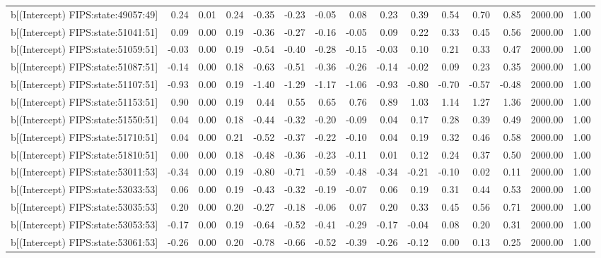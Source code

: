 \begin{table}[ht]
\begin{tabular}{rrrrrrrrrrrrrrr}
  b[(Intercept) FIPS:state:49057:49] & 0.24 & 0.01 & 0.24 & -0.35 & -0.23 & -0.05 & 0.08 & 0.23 & 0.39 & 0.54 & 0.70 & 0.85 & 2000.00 & 1.00 \\ 
  b[(Intercept) FIPS:state:51041:51] & 0.09 & 0.00 & 0.19 & -0.36 & -0.27 & -0.16 & -0.05 & 0.09 & 0.22 & 0.33 & 0.45 & 0.56 & 2000.00 & 1.00 \\ 
  b[(Intercept) FIPS:state:51059:51] & -0.03 & 0.00 & 0.19 & -0.54 & -0.40 & -0.28 & -0.15 & -0.03 & 0.10 & 0.21 & 0.33 & 0.47 & 2000.00 & 1.00 \\ 
  b[(Intercept) FIPS:state:51087:51] & -0.14 & 0.00 & 0.18 & -0.63 & -0.51 & -0.36 & -0.26 & -0.14 & -0.02 & 0.09 & 0.23 & 0.35 & 2000.00 & 1.00 \\ 
  b[(Intercept) FIPS:state:51107:51] & -0.93 & 0.00 & 0.19 & -1.40 & -1.29 & -1.17 & -1.06 & -0.93 & -0.80 & -0.70 & -0.57 & -0.48 & 2000.00 & 1.00 \\ 
  b[(Intercept) FIPS:state:51153:51] & 0.90 & 0.00 & 0.19 & 0.44 & 0.55 & 0.65 & 0.76 & 0.89 & 1.03 & 1.14 & 1.27 & 1.36 & 2000.00 & 1.00 \\ 
  b[(Intercept) FIPS:state:51550:51] & 0.04 & 0.00 & 0.18 & -0.44 & -0.32 & -0.20 & -0.09 & 0.04 & 0.17 & 0.28 & 0.39 & 0.49 & 2000.00 & 1.00 \\ 
  b[(Intercept) FIPS:state:51710:51] & 0.04 & 0.00 & 0.21 & -0.52 & -0.37 & -0.22 & -0.10 & 0.04 & 0.19 & 0.32 & 0.46 & 0.58 & 2000.00 & 1.00 \\ 
  b[(Intercept) FIPS:state:51810:51] & 0.00 & 0.00 & 0.18 & -0.48 & -0.36 & -0.23 & -0.11 & 0.01 & 0.12 & 0.24 & 0.37 & 0.50 & 2000.00 & 1.00 \\ 
  b[(Intercept) FIPS:state:53011:53] & -0.34 & 0.00 & 0.19 & -0.80 & -0.71 & -0.59 & -0.48 & -0.34 & -0.21 & -0.10 & 0.02 & 0.11 & 2000.00 & 1.00 \\ 
  b[(Intercept) FIPS:state:53033:53] & 0.06 & 0.00 & 0.19 & -0.43 & -0.32 & -0.19 & -0.07 & 0.06 & 0.19 & 0.31 & 0.44 & 0.53 & 2000.00 & 1.00 \\ 
  b[(Intercept) FIPS:state:53035:53] & 0.20 & 0.00 & 0.20 & -0.27 & -0.18 & -0.06 & 0.07 & 0.20 & 0.33 & 0.45 & 0.56 & 0.71 & 2000.00 & 1.00 \\ 
  b[(Intercept) FIPS:state:53053:53] & -0.17 & 0.00 & 0.19 & -0.64 & -0.52 & -0.41 & -0.29 & -0.17 & -0.04 & 0.08 & 0.20 & 0.31 & 2000.00 & 1.00 \\ 
  b[(Intercept) FIPS:state:53061:53] & -0.26 & 0.00 & 0.20 & -0.78 & -0.66 & -0.52 & -0.39 & -0.26 & -0.12 & 0.00 & 0.13 & 0.25 & 2000.00 & 1.00 \\ 

\end{tabular}
\end{table}
